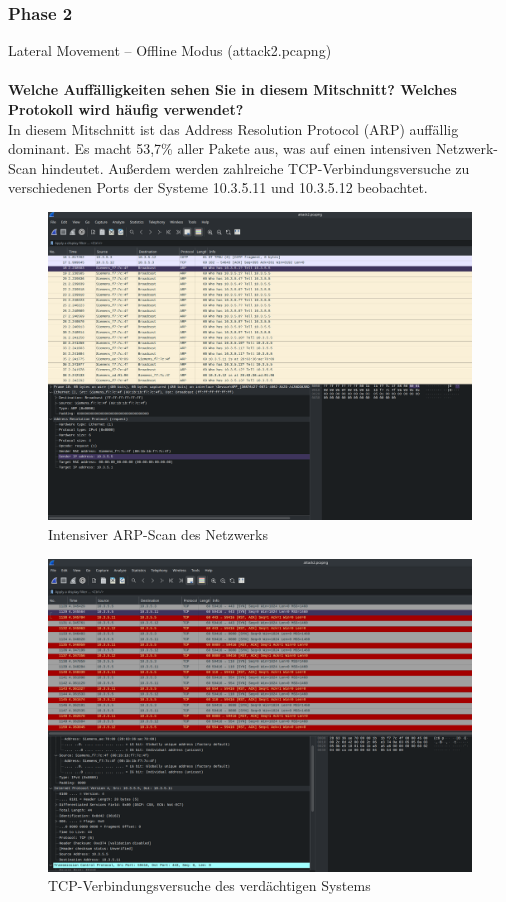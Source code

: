 \documentclass[
    a4paper,
    pagesize,
	pdftex,
    12pt,
]{scrartcl}
\begin{document}
\subsubsection{Phase 2}
Lateral Movement – Offline Modus (attack2.pcapng)
\\ \\
\textbf{Welche Auffälligkeiten sehen Sie in diesem Mitschnitt? Welches Protokoll wird häufig verwendet?}
\\
In diesem Mitschnitt ist das Address Resolution Protocol (ARP) auffällig dominant. Es macht 53,7\% aller Pakete aus, was auf einen intensiven Netzwerk-Scan hindeutet. Außerdem werden zahlreiche TCP-Verbindungsversuche zu verschiedenen Ports der Systeme 10.3.5.11 und 10.3.5.12 beobachtet.

\begin{figure}[H]
    \centering
    \includegraphics[width=\textwidth]{ws-arp-scan.png}
    \caption{Intensiver ARP-Scan des Netzwerks}
    \label{fig:ws-arp-scan}
\end{figure}

\begin{figure}[H]
    \centering
    \includegraphics[width=\textwidth]{ws-port-scan.png}
    \caption{TCP-Verbindungsversuche des verdächtigen Systems}
    \label{fig:ws-arp-scan}
\end{figure}
\end{document}

